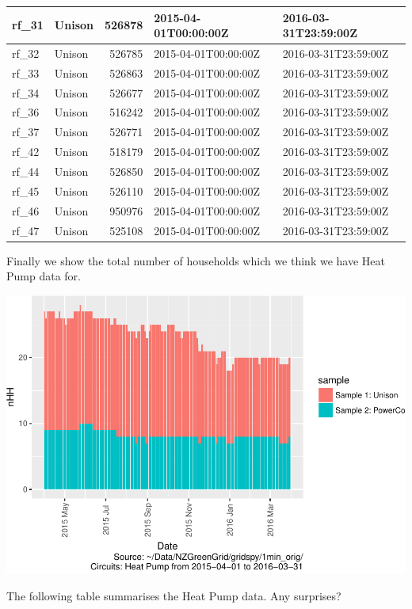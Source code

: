 \documentclass[]{article}
\begin{document}
\begin{table}
\begin{tabular}[t]{l|l|r|l|l}
\hline
rf\_31 & Unison & 526878 & 2015-04-01T00:00:00Z & 2016-03-31T23:59:00Z\\
\hline
rf\_32 & Unison & 526785 & 2015-04-01T00:00:00Z & 2016-03-31T23:59:00Z\\
\hline
rf\_33 & Unison & 526863 & 2015-04-01T00:00:00Z & 2016-03-31T23:59:00Z\\
\hline
rf\_34 & Unison & 526677 & 2015-04-01T00:00:00Z & 2016-03-31T23:59:00Z\\
\hline
rf\_36 & Unison & 516242 & 2015-04-01T00:00:00Z & 2016-03-31T23:59:00Z\\
\hline
rf\_37 & Unison & 526771 & 2015-04-01T00:00:00Z & 2016-03-31T23:59:00Z\\
\hline
rf\_42 & Unison & 518179 & 2015-04-01T00:00:00Z & 2016-03-31T23:59:00Z\\
\hline
rf\_44 & Unison & 526850 & 2015-04-01T00:00:00Z & 2016-03-31T23:59:00Z\\
\hline
rf\_45 & Unison & 526110 & 2015-04-01T00:00:00Z & 2016-03-31T23:59:00Z\\
\hline
rf\_46 & Unison & 950976 & 2015-04-01T00:00:00Z & 2016-03-31T23:59:00Z\\
\hline
rf\_47 & Unison & 525108 & 2015-04-01T00:00:00Z & 2016-03-31T23:59:00Z\\
\hline
\end{tabular}
\end{table}

Finally we show the total number of households which we think we have
Heat Pump data for.

\includegraphics{ggHeatPumpProfiles_files/figure-latex/liveDataHouseholds-1.pdf}

The following table summarises the Heat Pump data. Any surprises?
\end{document}
